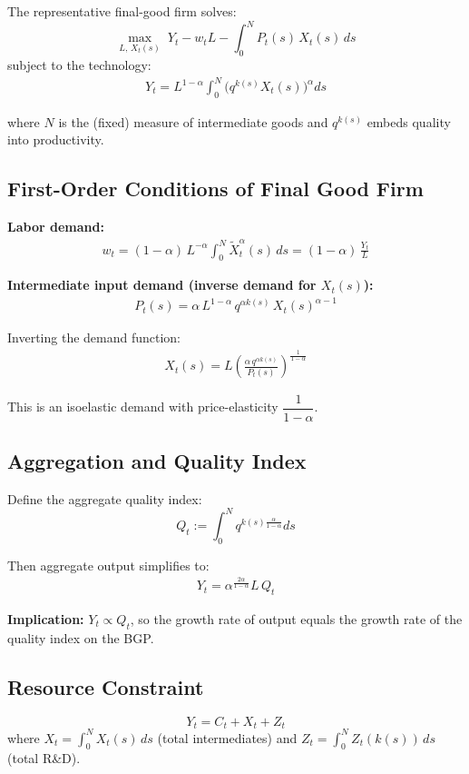 \documentclass[a4paper,11pt]{article}
\newcommand{\Xtilde}{\tilde{X}}
\begin{document}
The representative final-good firm solves:
\[
\max_{L,\, X_t(s)} \; Y_t - w_t L - \int_0^N P_t(s)\, X_t(s)\, ds
\]
subject to the technology:
\begin{align*}
Y_t = L^{1-\alpha} \int_0^N \bigl(q^{k(s)} X_t(s)\bigr)^\alpha ds
\tag{Final Good}
\end{align*}

where $N$ is the (fixed) measure of intermediate goods and $q^{k(s)}$ embeds quality into productivity.

\subsection*{First-Order Conditions of Final Good Firm}

\textbf{Labor demand:}
\begin{align*}
w_t = (1-\alpha)\,L^{-\alpha}\int_0^N \Xtilde_t^\alpha(s)\,ds = (1-\alpha)\,\frac{Y_t}{L}
\tag{Labor FOC}
\end{align*}

\textbf{Intermediate input demand (inverse demand for $X_t(s)$):}
\begin{align*}
P_t(s) = \alpha\, L^{1-\alpha}\, q^{\alpha k(s)}\, X_t(s)^{\alpha-1}
\tag{Demand}
\end{align*}

Inverting the demand function:
\begin{align*}
\boxed{X_t(s) = L\left(\frac{\alpha\, q^{\alpha k(s)}}{P_t(s)}\right)^{\frac{1}{1-\alpha}}}
\tag{Demand Inverted}
\end{align*}

This is an isoelastic demand with price-elasticity $\dfrac{1}{1-\alpha}$.

\subsection*{Aggregation and Quality Index}

Define the aggregate quality index:
\[
Q_t := \int_0^N q^{k(s)\frac{\alpha}{1-\alpha}} ds
\]

Then aggregate output simplifies to:
\begin{align*}
\boxed{Y_t = \alpha^{\frac{2\alpha}{1-\alpha}} L\, Q_t}
\tag{Aggregate Output}
\end{align*}

\textbf{Implication:} $Y_t \propto Q_t$, so the growth rate of output equals the growth rate of the quality index on the BGP.

\subsection*{Resource Constraint}
\[
Y_t = C_t + X_t + Z_t
\]
where $X_t = \int_0^N X_t(s)\,ds$ (total intermediates) and $Z_t = \int_0^N Z_t(k(s))\,ds$ (total R\&D).
\end{document}
